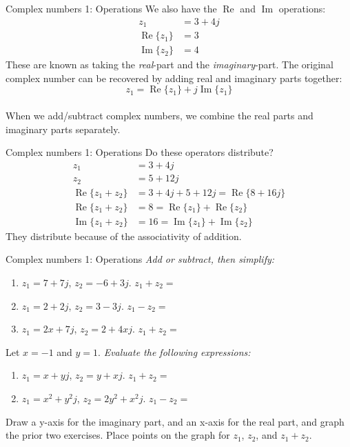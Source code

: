 \documentclass{beamer}
\begin{document}
\begin{frame}{Complex numbers 1: Operations}
We also have the $\operatorname{Re}$ and $\operatorname{Im}$ operations:
\begin{align}
z_1 &= 3+4j \\
\operatorname{Re}\lbrace z_1 \rbrace &= 3 \\
\operatorname{Im}\lbrace z_2 \rbrace &= 4
\end{align}
These are known as taking the \textit{real}-part and the \textit{imaginary}-part.  The original complex number can be recovered by adding real and imaginary parts together:
\begin{equation}
z_1 = \operatorname{Re}\lbrace z_1 \rbrace + j \operatorname{Im}\lbrace z_1 \rbrace
\end{equation} \\
When we add/subtract complex numbers, we combine the real parts and imaginary parts separately.
\end{frame}

\begin{frame}{Complex numbers 1: Operations}
Do these operators distribute?
\begin{align}
z_1 &= 3+4j \\
z_2 &= 5+12j \\
\operatorname{Re}\lbrace z_1+z_2 \rbrace &= 3+4j+5+12j = \operatorname{Re}\lbrace 8+16j \rbrace \\
\operatorname{Re}\lbrace z_1+z_2 \rbrace &= 8 = \operatorname{Re}\lbrace z_1 \rbrace + \operatorname{Re}\lbrace z_2 \rbrace \\
\operatorname{Im}\lbrace z_1+z_2 \rbrace &= 16 = \operatorname{Im}\lbrace z_1 \rbrace + \operatorname{Im}\lbrace z_2 \rbrace
\end{align}
They distribute because of the associativity of addition.
\end{frame}

\begin{frame}{Complex numbers 1: Operations}
\textit{Add or subtract, then simplify:}
\begin{enumerate}
\item $z_1 = 7+7j$, $z_2 = -6+3j$.  $z_1+z_2 = $
\item $z_1 = 2+2j$, $z_2 = 3-3j$.  $z_1-z_2 = $
\item $z_1 = 2x+7j$, $z_2 = 2+4xj$.  $z_1+z_2 = $
\end{enumerate}
Let $x=-1$ and $y=1$.  \textit{Evaluate the following expressions:}
\begin{enumerate}
\item $z_1 = x+yj$, $z_2 = y+xj$.  $z_1+z_2 = $
\item $z_1 = x^2+y^2j$, $z_2 = 2y^2+x^2j$.  $z_1-z_2 = $
\end{enumerate}
Draw a y-axis for the imaginary part, and an x-axis for the real part, and graph the prior two exercises.  Place points on the graph for $z_1$, $z_2$, and $z_1+z_2$.
\end{frame}
\end{document}
